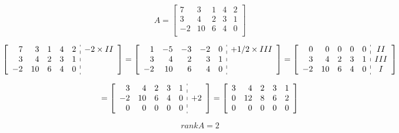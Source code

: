 {}

$$
A = \begin{bmatrix}
    7 & 3 & 1 & 4 & 2 \\
    3 & 4 & 2 & 3 & 1 \\
  -2 & 10 & 6 & 4 & 0 \\
\end{bmatrix}
$$

$$
\left[ \begin{array}{rrrrr:c}
    7 & 3 & 1 & 4 & 2 & - 2 \times II\\
    3 & 4 & 2 & 3 & 1 & \\
  -2 & 10 & 6 & 4 & 0 & \\
\end{array} \right] =
\left[ \begin{array}{rrrrr:c}
    1 & -5 & -3 & -2 & 0 & +  1/2 \times III \\
    3 &  4 &  2 &  3 & 1 & \\
   -2 & 10 &  6 &  4 & 0 & \\
\end{array} \right]  =
\left[ \begin{array}{rrrrr:c}
    0 &  0 &  0 &  0 & 0 & II \\
    3 &  4 &  2 &  3 & 1 & III\\
   -2 & 10 &  6 &  4 & 0 & I \\
\end{array} \right]
$$

$$
= \left[ \begin{array}{rrrrr:c}
    3 &  4 &  2 &  3 & 1 &     \\
   -2 & 10 &  6 &  4 & 0 & +2  \\
    0 &  0 &  0 &  0 & 0 &     \\
\end{array} \right]
= \left[ \begin{array}{rrrrr}
    3 &  4 &  2 &  3 & 1 \\
    0 & 12 &  8 &  6 & 2 \\
    0 &  0 &  0 &  0 & 0 \\
\end{array} \right]
$$


$$
\boxed{ rank{A} = 2 }
$$
